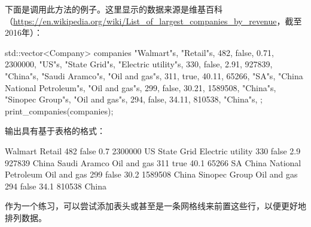 下面是调用此方法的例子。这里显示的数据来源是维基百科（\url{https://en.wikipedia.org/wiki/List_of_largest_companies_by_revenue}，截至2016年）：

\begin{cpp}
std::vector<Company> companies
{
    {"Walmart"s, "Retail"s, 482, false, 0.71,
        2300000, "US"s},
    {"State Grid"s, "Electric utility"s, 330, false, 2.91,
        927839, "China"s},
    {"Saudi Aramco"s, "Oil and gas"s, 311, true, 40.11,
        65266, "SA"s},
    {"China National Petroleum"s, "Oil and gas"s, 299,
        false, 30.21, 1589508, "China"s},
    {"Sinopec Group"s, "Oil and gas"s, 294, false, 34.11,
        810538, "China"s},
};
print_companies(companies);
\end{cpp}

输出具有基于表格的格式：

\begin{shell}
Walmart                   Retail            482  false  0.7  2300000 US
State Grid                Electric utility  330  false  2.9   927839 China
Saudi Aramco              Oil and gas       311  true  40.1    65266 SA
China National Petroleum  Oil and gas       299  false 30.2  1589508 China
Sinopec Group             Oil and gas       294  false 34.1   810538 China
\end{shell}

作为一个练习，可以尝试添加表头或甚至是一条网格线来前置这些行，以便更好地排列数据。

